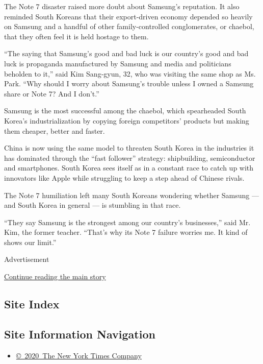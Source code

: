 The Note 7 disaster raised more doubt about Samsung's reputation. It
also reminded South Koreans that their export-driven economy depended so
heavily on Samsung and a handful of other family-controlled
conglomerates, or chaebol, that they often feel it is held hostage to
them.

``The saying that Samsung's good and bad luck is our country's good and
bad luck is propaganda manufactured by Samsung and media and politicians
beholden to it,'' said Kim Sang-gyun, 32, who was visiting the same shop
as Ms. Park. ``Why should I worry about Samsung's trouble unless I owned
a Samsung share or Note 7? And I don't.''

Samsung is the most successful among the chaebol, which spearheaded
South Korea's industrialization by copying foreign competitors' products
but making them cheaper, better and faster.

China is now using the same model to threaten South Korea in the
industries it has dominated through the ``fast follower'' strategy:
shipbuilding, semiconductor and smartphones. South Korea sees itself as
in a constant race to catch up with innovators like Apple while
struggling to keep a step ahead of Chinese rivals.

The Note 7 humiliation left many South Koreans wondering whether Samsung
--- and South Korea in general --- is stumbling in that race.

``They say Samsung is the strongest among our country's businesses,''
said Mr. Kim, the former teacher. ``That's why its Note 7 failure
worries me. It kind of shows our limit.''

Advertisement

\protect\hyperlink{after-bottom}{Continue reading the main story}

\hypertarget{site-index}{%
\subsection{Site Index}\label{site-index}}

\hypertarget{site-information-navigation}{%
\subsection{Site Information
Navigation}\label{site-information-navigation}}

\begin{itemize}
\tightlist
\item
  \href{https://help.nytimes.com/hc/en-us/articles/115014792127-Copyright-notice}{©~2020~The
  New York Times Company}
\end{itemize}

